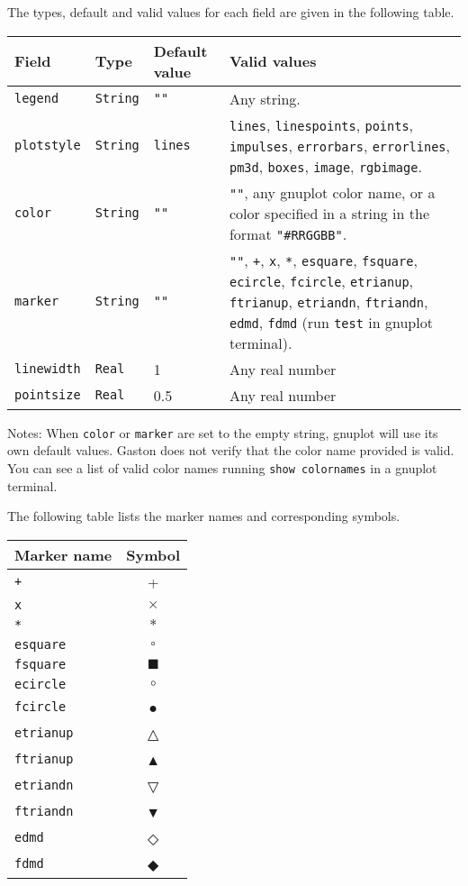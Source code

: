 \documentclass[11pt]{article}
\newcommand{\cmd}[1]{\texttt{#1}}
\begin{document}
The types, default and valid values for each field are given in the following
table.

{\small
\begin{center}
	\begin{tabular}{lp{1.5cm}p{2cm}p{7.5cm}}
	\toprule
	\textbf{Field} & \textbf{Type} & \textbf{Default value} & \textbf{Valid values} \\
	\midrule
	\cmd{legend} & \cmd{String} & \cmd{""} & Any string. \\
	\cmd{plotstyle} & \cmd{String} & \cmd{lines} & \cmd{lines}, \cmd{linespoints},
	\cmd{points}, \cmd{impulses}, \cmd{errorbars}, \cmd{errorlines},
	\cmd{pm3d}, \cmd{boxes}, \cmd{image}, \cmd{rgbimage}. \\
	\cmd{color} & \cmd{String} & \cmd{""} & \cmd{""}, any gnuplot color name,
	or a color specified in a string in the format \cmd{"\#RRGGBB"}. \\
	\cmd{marker} & \cmd{String} & \cmd{""} & \cmd{""}, \cmd{+}, \cmd{x}, \cmd{*}, \cmd{esquare},
	\cmd{fsquare}, \cmd{ecircle}, \cmd{fcircle}, \cmd{etrianup},
	\cmd{ftrianup}, \cmd{etriandn}, \cmd{ftriandn}, \cmd{edmd}, \cmd{fdmd} (run
	\cmd{test} in gnuplot terminal). \\
	\cmd{linewidth} & \cmd{Real} & 1 & Any real number \\
	\cmd{pointsize} & \cmd{Real} & 0.5 & Any real number \\
	\bottomrule
\end{tabular}
\end{center}}

Notes: When \cmd{color} or \cmd{marker} are set to the empty string, gnuplot will use
its own default values. Gaston does not verify that the color name provided is
valid. You can see a list of valid color names running \cmd{show colornames} in
a gnuplot terminal.

The following table lists the marker names and corresponding symbols.

{\small
\begin{center}
\begin{tabular}{lc}
	\toprule
	\textbf{Marker name} & \textbf{Symbol} \\
	\midrule
	\cmd{+} & + \\
	\cmd{x} & $\times$ \\
	\cmd{*} & $\ast$ \\
	\cmd{esquare} & $\square$ \\
	\cmd{fsquare} & $\blacksquare$ \\
	\cmd{ecircle} & $\circ$ \\
	\cmd{fcircle} & ● \\
	\cmd{etrianup} & △ \\
	\cmd{ftrianup} & ▲ \\
	\cmd{etriandn} & ▽ \\
	\cmd{ftriandn} & ▼ \\
	\cmd{edmd} & ◇ \\
	\cmd{fdmd} & ◆ \\
	\bottomrule
\end{tabular}
\end{center}}
\end{document}
